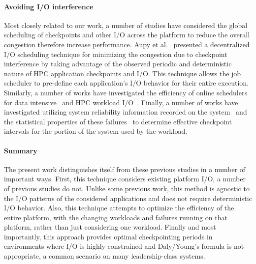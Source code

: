 \paragraph*{Avoiding I/O interference}

Most closely related to our work, a number of studies have considered the
global scheduling of checkpoints and other I/O across the platform to reduce
the overall congestion therefore increase performance.  Aupy et
al.~\cite{Aupy:2017:Periodic} presented a decentralized I/O scheduling
technique for minimizing the congestion due to checkpoint interference by
taking advantage of the observed periodic and deterministic nature of HPC
application checkpoints and I/O.  This technique allows the job scheduler to
pre-define each application’s I/O behavior for their entire execution.
Similarly, a number of works have investigated the efficiency of online
schedulers for data intensive~\cite{Groot2013,Sim:2015:AnalyzeThis} and HPC
workload
I/O~\cite{Dorier2015,Gainaru:2016:Scheduling,Zhou:2015:IOAware,Herbein2017}.
Finally, a number of works have investigated utilizing system reliability
information recorded on the system~\cite{Oliner:2006:Cooperative} and the
statistical properties of these failures~\cite{Tiwari:2014:Lazy} to determine
effective checkpoint intervals for the portion of the system used by the
workload.

\paragraph*{Summary}

The present work distinguishes itself from these previous studies in a number
of important ways.  First, this technique considers existing platform I/O, a
number of previous studies do not.  Unlike some previous work, this method is
agnostic to the I/O patterns of the considered applications and does not
require deterministic I/O behavior.  Also, this technique attempts to optimize
the efficiency of the entire platform, with the changing workloads and failures
running on that platform, rather than just considering one workload. Finally
and most importantly, this approach provides optimal checkpointing periods in
environments where I/O is highly constrained and Daly/Young's formula is not
appropriate, a common scenario on many leadership-class systems.
